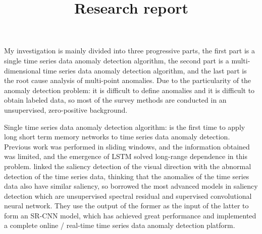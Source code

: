 
\begin{survey}
\label{cha:survey}

\title{Research report}
\maketitle

My investigation is mainly divided into three progressive parts, the first part is a single time series data anomaly detection algorithm, the second part is a multi-dimensional time series data anomaly detection algorithm, and the last part is the root cause analysis of multi-point anomalies. Due to the particularity of the anomaly detection problem: it is difficult to define anomalies and it is difficult to obtain labeled data, so most of the survey methods are conducted in an unsupervised, zero-positive background.

Single time series data anomaly detection algorithm: \cite{malhotra2015long} is the first time to apply long short term memory networks to time series data anomaly detection. Previous work was performed in sliding windows, and the information obtained was limited, and the emergence of LSTM solved long-range dependence in this problem. \cite{DBLP:conf/kdd/RenXWYHKXYTZ19} linked the saliency detection of the visual direction with the abnormal detection of the time series data, thinking that the anomalies of the time series data also have similar saliency, so borrowed the most advanced models in saliency detection which are unsupervised spectral residual and supervised convolutional neural network. They use the output of the former as the input of the latter to form an SR-CNN model, which has achieved great performance and implemented a complete online / real-time time series data anomaly detection platform.


\end{survey}
